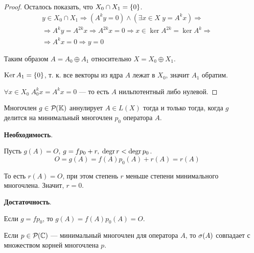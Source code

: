 \begin{proof}
    Осталось показать, что $X_0 \cap X_1 = \menge{0}$.
    \begin{multline*}
        y \in X_0 \cap X_1 \Rightarrow (A^k y = 0) \wedge (\exists x \in X \; y =
        A^k x) \Rightarrow \\ \Rightarrow A^k y = A^{2k}x  \Rightarrow A^{2k}x = 0
        \Rightarrow x \in \ker A^{2k} = \ker A^k \Rightarrow \\ \Rightarrow A^k x = 0
        \Rightarrow y = 0
    \end{multline*}
    
    Таким образом $A = A_0 \oplus A_1$ относительно $X = X_0 \oplus X_1$.

    $\ker A_1 = \menge{0}$, т. к. все векторы из ядра $A$ лежат в $X_0$, значит
    $A_1$ обратим.

    $\forall x \in X_0 \; A_0^k x = A^k x = 0$ — то есть $A$ нильпотентный либо
    нулевой.
\end{proof}

\begin{lemma}
    Многочлен $g\in \polyset{}$ аннулирует $A\in L(X)$ тогда и только тогда,
    когда $g$ делится на минимальный многочлен $p_0$ оператора $A$.
\end{lemma}

\begin{proofbreak}
    \dindent \textbf{Необходимость}.

    Пусть $g(A) = O$, $g = f p_0 + r, \; \degr r < \degr p_0$.
    \[ O = g(A) = f(A) p_0(A) + r(A) = r(A) \]

    То есть $r(A) = O$, при этом степень $r$ меньше степени
    минимального многочлена. Значит, $r = 0$.

    \textbf{Достаточность}.
    
    Если $g = fp_0$, то $g(A) = f(A) p_0(A) = O$.
\end{proofbreak}

\begin{lemma}
    Если $p \in \polyset[\fieldc]{}$ — минимальный многочлен для оператора $A$, то
    $\spectrum{A}$ совпадает с множеством корней многочлена $p$.
\end{lemma}

